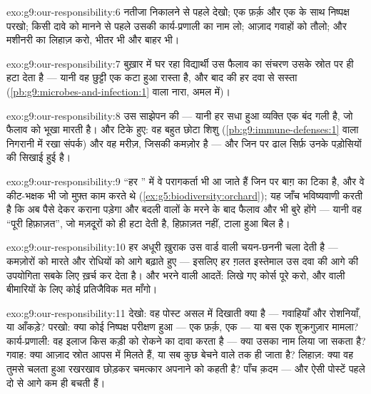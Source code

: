 \begin{solution}{exo:g9:our-responsibility:6}
नतीजा निकालने से पहले देखो; एक फ़र्क़ और एक  के साथ निष्पक्ष
परखो; किसी दावे को मानने से पहले उसकी कार्य-प्रणाली का नाम लो; आज़ाद
गवाहों को तौलो; और  मशीनरी का लिहाज़ करो, भीतर भी और बाहर भी।
\end{solution}

\begin{solution}{exo:g9:our-responsibility:7}
बुख़ार में घर रहा विद्यार्थी उस फैलाव का संचरण उसके स्रोत पर ही हटा देता
है --- यानी वह छुट्टी एक कटा हुआ रास्ता है, और बाद की हर दवा से सस्ता
(\cref{pb:g9:microbes-and-infection:1} वाला नारा, अमल में)।
\end{solution}

\begin{solution}{exo:g9:our-responsibility:8}
उस साझेपन की --- यानी हर सधा हुआ व्यक्ति एक बंद गली है, जो फैलाव को भूखा
मारती है। और टिके हुए: वह बहुत छोटा शिशु
(\cref{pb:g9:immune-defenses:1} वाला निगरानी में रखा संपर्क) और वह
मरीज़, जिसकी  कमज़ोर है --- और जिन पर ढाल सिर्फ़ उनके पड़ोसियों
की सिखाई हुई है।
\end{solution}

\begin{solution}{exo:g9:our-responsibility:9}
``हर '' में वे परागकर्ता भी आ जाते हैं जिन पर बाग़ का  टिका है, और
वे कीट-भक्षक भी जो मुफ़्त काम करते थे
(\cref{ex:g5:biodiversity:orchard}); यह जाँच भविष्यवाणी करती है कि
 अब पैसे देकर कराना पड़ेगा और बदली वालों के मरने के बाद फैलाव और भी
बुरे होंगे --- यानी वह ``पूरी हिफ़ाज़त'', जो मज़दूरों को ही हटा देती है,
हिफ़ाज़त नहीं, टाला हुआ बिल है।
\end{solution}

\begin{solution}{exo:g9:our-responsibility:10}
हर अधूरी ख़ुराक उस वार्ड वाली चयन-छननी चला देती है --- कमज़ोरों को मारते
और रोधियों को आगे बढ़ाते हुए --- इसलिए हर ग़लत इस्तेमाल उस दवा की आगे की
उपयोगिता सबके लिए ख़र्च कर देता है। और भरने वाली आदतें: लिखे गए कोर्स
पूरे करो, और  वाली बीमारियों के लिए कोई प्रतिजैविक मत माँगो।
\end{solution}

\begin{solution}{exo:g9:our-responsibility:11}
देखो: वह पोस्ट असल में दिखाती क्या है --- गवाहियाँ और रोशनियाँ, या
आँकड़े? परखो: क्या कोई निष्पक्ष परीक्षण हुआ --- एक फ़र्क़, एक 
--- या बस एक शुक्रगुज़ार मामला? कार्य-प्रणाली: वह इलाज किस कड़ी को रोकने
का दावा करता है --- क्या उसका नाम लिया जा सकता है? गवाह: क्या आज़ाद
स्रोत आपस में मिलते हैं, या सब कुछ बेचने वाले तक ही जाता है? लिहाज़: क्या
वह तुमसे चलता हुआ रखरखाव छोड़कर चमत्कार अपनाने को कहती है? पाँच क़दम ---
और ऐसी पोस्टें पहले दो से आगे कम ही बचती हैं।
\end{solution}

